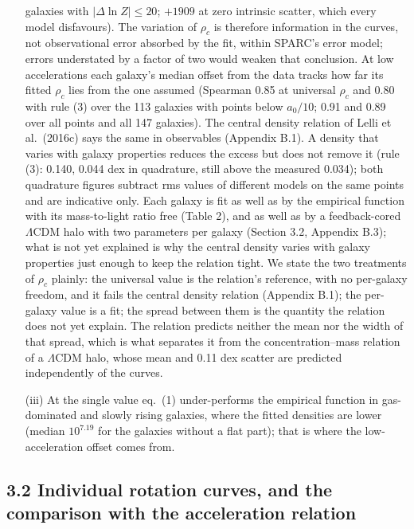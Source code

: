 \documentclass[
  10pt,
]{article}
\begin{document}
\begin{itemize}
galaxies with $|\Delta\ln Z|\le20$; $+1909$ at zero intrinsic scatter, which every model disfavours). The variation of $\rho_c$ is therefore information in the curves, not observational error absorbed by the fit, within SPARC's error model; errors understated by a factor of two would weaken that conclusion. At low accelerations each galaxy's median offset from the data tracks how far its fitted $\rho_c$ lies from the one assumed (Spearman 0.85 at universal $\rho_c$ and 0.80 with rule (3) over the 113 galaxies with points below $a_0/10$; 0.91 and 0.89 over all points and all 147 galaxies). The central density relation of Lelli et al.~(2016c) says the same in observables (Appendix B.1). A density that varies with galaxy properties reduces the excess but does not remove it (rule (3): 0.140, 0.044 dex in quadrature, still above the measured 0.034); both quadrature figures subtract rms values of different models on the same points and are indicative only. Each galaxy is fit as well as by the empirical function with its mass-to-light ratio free (Table 2), and as well as by a feedback-cored $\Lambda$CDM halo with two parameters per galaxy (Section 3.2, Appendix B.3); what is not yet explained is why the central density varies with galaxy properties just enough to keep the relation tight. We state the two treatments of $\rho_c$ plainly: the universal value is the relation's reference, with no per-galaxy freedom, and it fails the central density relation (Appendix B.1); the per-galaxy value is a fit; the spread between them is the quantity the relation does not yet explain. The relation predicts neither the mean nor the width of that spread, which is what separates it from the concentration--mass relation of a $\Lambda$CDM halo, whose mean and 0.11 dex scatter are predicted independently of the curves.
\item[(iii)] At the single value eq.~(1) under-performs the empirical function in gas-dominated and slowly rising galaxies, where the fitted densities are lower (median $10^{7.19}$ for the galaxies without a flat part); that is where the low-acceleration offset comes from.
\end{itemize}


\subsection{3.2 Individual rotation curves, and the comparison with the acceleration relation}\label{individual-rotation-curves-and-the-comparison-with-the-acceleration-relation}
\end{document}
